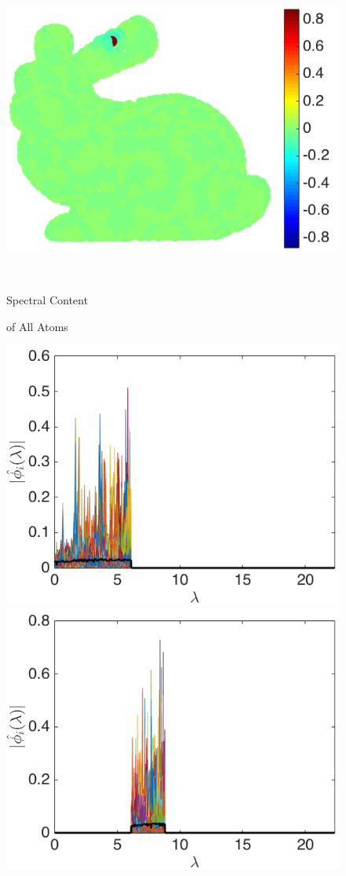 \documentclass{article}
\begin{document}
\begin{figure}[bth]
\begin{minipage}[m]{0.16\linewidth}
\end{minipage}
\begin{minipage}[m]{0.16\linewidth}
\centerline{~~\includegraphics[width=.85\linewidth]{fig_bunny_atom_wav4a}}
\end{minipage}\\
\begin{minipage}[m]{0.16\linewidth}
\centerline{\small{Spectral Content}}
\centerline{\small{of All Atoms}}
\end{minipage}
\begin{minipage}[m]{0.16\linewidth}
\centerline{\includegraphics[width=.8\linewidth]{fig_bunny_freq_scaling3}}
\end{minipage}
\begin{minipage}[m]{0.16\linewidth}
\centerline{\includegraphics[width=.8\linewidth]{fig_bunny_freq_wav1a}}

\end{minipage}
\end{figure}
\end{document}
